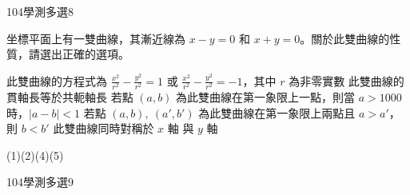 \begin{QUESTIONS}
\begin{QUESTION}
\begin{QSOLLIST}
\begin{QSOL}
\begin{pspicture*}
				\end{pspicture*}
			\end{QSOL}
        \end{QSOLLIST}
        \begin{QEMPTYSPACE}
        \end{QEMPTYSPACE}
    \end{QUESTION}
    \begin{QUESTION}
        \begin{ExamInfo}{104}{學測}{多選}{8}
        \end{ExamInfo}
        \begin{ExamAnsRateInfo}{48}{71}{49}{24}
        \end{ExamAnsRateInfo}
        \begin{QBODY}
            坐標平面上有一雙曲線，其漸近線為 $x-y=0$ 和 $x+y=0$。關於此雙曲線的性質，請選出正確的選項。
			\begin{QOPS}
				\QOP 此雙曲線的方程式為 $\frac{{{x}^{2}}}{{{r}^{2}}}-\frac{{{y}^{2}}}{{{r}^{2}}}=1$ 或 $\frac{{{x}^{2}}}{{{r}^{2}}}-\frac{{{y}^{2}}}{{{r}^{2}}}=-1$，其中 $r$ 為非零實數
				\QOP 此雙曲線的貫軸長等於共軛軸長
				\QOP 若點 $\left( a,b \right)$ 為此雙曲線在第一象限上一點，則當 $a>1000$ 時，$\left| a-b \right|<1$
				\QOP 若點 $\left( a,b \right),\ \left( a',b' \right)$ 為此雙曲線在第一象限上兩點且 $a>a'$，則 $b<b'$
				\QOP 此雙曲線同時對稱於 $x$ 軸 與 $y$ 軸
			\end{QOPS}
        \end{QBODY}
        \begin{QFROMS}
        \end{QFROMS}
        \begin{QTAGS}\end{QTAGS}
        \begin{QANS}
            (1)(2)(4)(5)
        \end{QANS}
        \begin{QSOLLIST}
        \end{QSOLLIST}
        \begin{QEMPTYSPACE}
        \end{QEMPTYSPACE}
    \end{QUESTION}
    \begin{QUESTION}
        \begin{ExamInfo}{104}{學測}{多選}{9}
        \end{ExamInfo}
        \begin{ExamAnsRateInfo}{49}{77}{45}{25}

\end{ExamAnsRateInfo}
\end{QUESTION}
\end{QUESTIONS}

